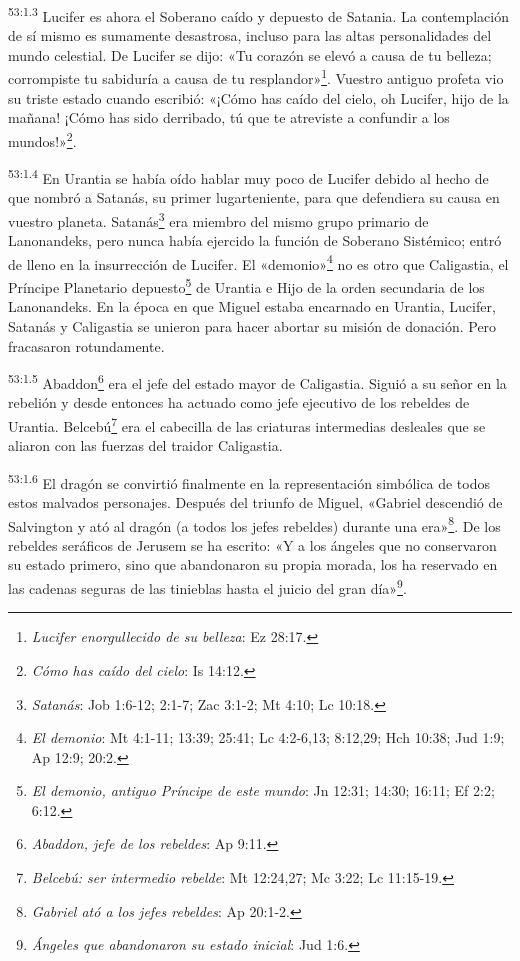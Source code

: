\par
\textsuperscript{53:1.3} Lucifer es ahora el Soberano caído y depuesto de Satania. La contemplación de sí mismo es sumamente desastrosa, incluso para las altas personalidades del mundo celestial. De Lucifer se dijo: «Tu corazón se elevó a causa de tu belleza; corrompiste tu sabiduría a causa de tu resplandor»\footnote{\textit{Lucifer enorgullecido de su belleza}: Ez 28:17.}. Vuestro antiguo profeta vio su triste estado cuando escribió: «¡Cómo has caído del cielo, oh Lucifer, hijo de la mañana! ¡Cómo has sido derribado, tú que te atreviste a confundir a los mundos!»\footnote{\textit{Cómo has caído del cielo}: Is 14:12.}.

\par
\textsuperscript{53:1.4} En Urantia se había oído hablar muy poco de Lucifer debido al hecho de que nombró a Satanás, su primer lugarteniente, para que defendiera su causa en vuestro planeta. Satanás\footnote{\textit{Satanás}: Job 1:6-12; 2:1-7; Zac 3:1-2; Mt 4:10; Lc 10:18.} era miembro del mismo grupo primario de Lanonandeks, pero nunca había ejercido la función de Soberano Sistémico; entró de lleno en la insurrección de Lucifer. El «demonio»\footnote{\textit{El demonio}: Mt 4:1-11; 13:39; 25:41; Lc 4:2-6,13; 8:12,29; Hch 10:38; Jud 1:9; Ap 12:9; 20:2.} no es otro que Caligastia, el Príncipe Planetario depuesto\footnote{\textit{El demonio, antiguo Príncipe de este mundo}: Jn 12:31; 14:30; 16:11; Ef 2:2; 6:12.} de Urantia e Hijo de la orden secundaria de los Lanonandeks. En la época en que Miguel estaba encarnado en Urantia, Lucifer, Satanás y Caligastia se unieron para hacer abortar su misión de donación. Pero fracasaron rotundamente.

\par
\textsuperscript{53:1.5} Abaddon\footnote{\textit{Abaddon, jefe de los rebeldes}: Ap 9:11.} era el jefe del estado mayor de Caligastia. Siguió a su señor en la rebelión y desde entonces ha actuado como jefe ejecutivo de los rebeldes de Urantia. Belcebú\footnote{\textit{Belcebú: ser intermedio rebelde}: Mt 12:24,27; Mc 3:22; Lc 11:15-19.} era el cabecilla de las criaturas intermedias desleales que se aliaron con las fuerzas del traidor Caligastia.

\par
\textsuperscript{53:1.6} El dragón se convirtió finalmente en la representación simbólica de todos estos malvados personajes. Después del triunfo de Miguel, «Gabriel descendió de Salvington y ató al dragón (a todos los jefes rebeldes) durante una era»\footnote{\textit{Gabriel ató a los jefes rebeldes}: Ap 20:1-2.}. De los rebeldes seráficos de Jerusem se ha escrito: «Y a los ángeles que no conservaron su estado primero, sino que abandonaron su propia morada, los ha reservado en las cadenas seguras de las tinieblas hasta el juicio del gran día»\footnote{\textit{Ángeles que abandonaron su estado inicial}: Jud 1:6.}.

